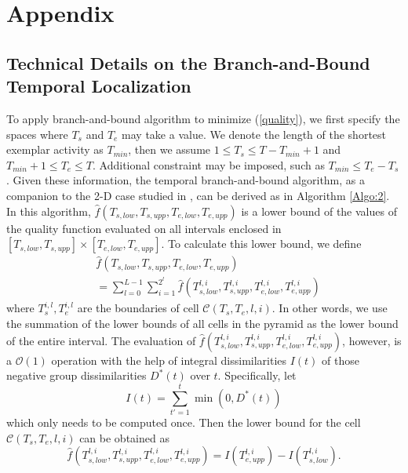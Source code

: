 \section{Appendix}

\subsection{Technical Details on the Branch-and-Bound Temporal Localization}
\label{detailBB}

To apply branch-and-bound algorithm to minimize (\ref{quality}), we first specify the spaces where $T_{s}$ and $T_{e}$ may take a value. We denote the length of the shortest exemplar activity as $T_{min}$, then we assume $1\leq T_{s}\leq T-T_{min}+1$ and $T_{min}+1\leq T_{e}\leq T$. Additional constraint may be imposed, such as $T_{min}\leq T_{e}-T_{s}$. Given these information,  the temporal branch-and-bound algorithm, as a companion to the 2-D case studied in \cite{Lampert}, can be derived as in Algorithm \ref{Algo:2}.  In this algorithm, $\hat{f}(T_{s,low}, T_{s,upp}, T_{e,low}, T_{e,upp})$ is a lower bound of the values of the quality function evaluated on all intervals enclosed in $[T_{s,low}, T_{s,upp}]\times [T_{e,low}, T_{e,upp}]$. To calculate this lower bound, we define
\begin{equation}
\begin{split}
&\hat{f}(T_{s,low}, T_{s,upp}, T_{e,low}, T_{e,upp})\\
&=\sum^{L-1}_{l=0}\sum^{2^{l}}_{i=1} \hat{f}(T^{l,i}_{s,low}, T^{l,i}_{s,upp}, T^{l,i}_{e,low}, T^{l,i}_{e,upp})
\end{split}
\end{equation}
where $T^{i,l}_{s}, T^{i,l}_{e}$ are the boundaries of cell $\mathcal{C}(T_{s},T_{e}, l,i)$. In other words, we use the summation of the lower bounds of all cells in the pyramid as the lower bound of the entire interval. The evaluation of $\hat{f}(T^{l,i}_{s,low}, T^{l,i}_{s,upp}, T^{l,i}_{e,low}, T^{l,i}_{e,upp})$, however, is a $\mathcal{O}(1)$ operation with the help of integral dissimilarities $I(t)$ of those negative group dissimilarities $D^{*}(t)$ over $t$. Specifically, let
\begin{equation}
I(t)=\sum^{t}_{t'=1} \min(0,D^{*}(t))
\end{equation}
which only needs to be computed once. Then the lower bound for the cell $\mathcal{C}(T_{s},T_{e}, l,i)$ can be obtained as
\begin{equation}
\hat{f}(T^{l,i}_{s,low}, T^{l,i}_{s,upp}, T^{l,i}_{e,low}, T^{l,i}_{e,upp})=I(T^{l,i}_{e,upp})-I(T^{l,i}_{s,low}).
\end{equation}


